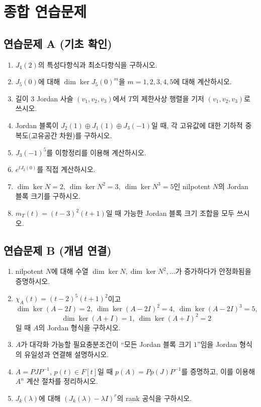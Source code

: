 \chaptersummarytemplate

\section*{종합 연습문제}

\subsection*{연습문제 A (기초 확인)}
\begin{enumerate}[label=\textbf{A\arabic*.}]
\item $J_4(2)$의 특성다항식과 최소다항식을 구하시오.
\item $J_5(0)$에 대해 $\dim\ker J_5(0)^m$을 $m=1,2,3,4,5$에 대해 계산하시오.
\item 길이 $3$ Jordan 사슬 $(v_1,v_2,v_3)$에서 $T$의 제한사상 행렬을 기저 $(v_1,v_2,v_3)$로 쓰시오.
\item Jordan 블록이 $J_2(1)\oplus J_1(1)\oplus J_3(-1)$일 때, 각 고유값에 대한 기하적 중복도(고유공간 차원)를 구하시오.
\item $J_3(-1)^5$를 이항정리를 이용해 계산하시오.
\item $e^{tJ_2(0)}$를 직접 계산하시오.
\item $\dim\ker N=2,\ \dim\ker N^2=3,\ \dim\ker N^3=5$인 nilpotent $N$의 Jordan 블록 크기를 구하시오.
\item $m_T(t)=(t-3)^2(t+1)$일 때 가능한 Jordan 블록 크기 조합을 모두 쓰시오.
\end{enumerate}

\subsection*{연습문제 B (개념 연결)}
\begin{enumerate}[label=\textbf{B\arabic*.}]
\item nilpotent $N$에 대해 수열 $\dim\ker N,\dim\ker N^2,\dots$가 증가하다가 안정화됨을 증명하시오.
\item $\chi_A(t)=(t-2)^5(t+1)^2$이고
$$
\dim\ker(A-2I)=2,\ \dim\ker(A-2I)^2=4,\ \dim\ker(A-2I)^3=5,
$$
$$
\dim\ker(A+I)=1,\ \dim\ker(A+I)^2=2
$$
일 때 $A$의 Jordan 형식을 구하시오.
\item $A$가 대각화 가능할 필요충분조건이 ``모든 Jordan 블록 크기 $1$''임을 Jordan 형식의 유일성과 연결해 설명하시오.
\item $A=PJP^{-1}$, $p(t)\in F[t]$일 때 $p(A)=Pp(J)P^{-1}$를 증명하고, 이를 이용해 $A^n$ 계산 절차를 정리하시오.
\item $J_k(\lambda)$에 대해 $(J_k(\lambda)-\lambda I)^r$의 rank 공식을 구하시오.
\end{enumerate}

